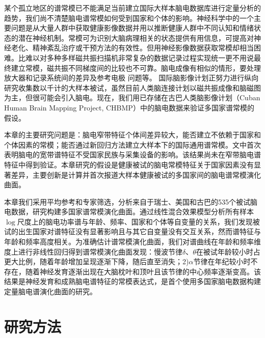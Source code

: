某个孤立地区的谱常模已不能满足当前建立国际大样本脑电数据库进行定量分析的趋势，我们尚不清楚脑电谱常模如何受到国家和个体的影响。神经科学中的一个主要问题是从大量人群中获取健康影像数据并用以推断健康人群中不同认知和情绪状态的潜在神经机制。常模可为识别大脑病理相关的状态提供有用信息，可提高对神经老化、精神紊乱治疗或干预方法的有效性。但用神经影像数据获取常模却相当困难。比难以对多种多样磁共振扫描机非常复杂的数据记录过程实现统一更不用说最终建立常模，磁共振不同梯度间的比较也不可靠。脑电成像有相似的情形，要处理放大器和记录系统间的差异及参考电极
问题等。 国际脑影像计划正努力进行纵向研究收集数以千计的大样本被试，虽然目前人类脑连接计划以磁共振成像和脑磁图为主，但很可能会引入脑电。现在，我们用已存储在古巴人类脑影像计划（Cuban Human Brain Mapping Project, CHBMP）中的脑电数据来验证多国家谱常模的假设。

本章的主要研究问题是：脑电窄带特征个体间差异较大，能否建立不依赖于国家和个体因素的常模；能否通过新回归方法建立大样本下的国际通用谱常模。\cite{john1977neurometrics}文中首次表明脑电的宽带谱特征不受国家民族与采集设备的影响。该结果尚未在窄带脑电谱特征中得到验证。本章研究的假设是健康被试的脑电常模特征关于国家因素没有显著差异，主要创新是计算并首次报道大样本健康被试的多国家间的脑电谱常模演化曲面。

本章我们采用平均参考和专家筛选，分析来自于瑞士、美国和古巴的535个被试脑电数据，研究构建多国家谱常模演化曲面。通过线性混合效果模型分析所有样本$\log$尺度上的脑电功率谱与年龄、频率、国家和个体等自变量的关系，我们发现被试的出生国家对谱特征没有显著影响且与其它自变量没有交互关系，然而谱特征与年龄和频率高度相关。为准确估计谱常模演化曲面，我们对谱曲线在年龄和频率维度上进行非线性回归得到谱常模演化曲面发现：慢波节律$\delta$、$\theta$在被试年龄较小时占更大比例，随着年龄增加呈现逐渐下降，随后直至消失；2)$\alpha$节律在年纪较小时不存在，随着神经发育逐渐出现在大脑枕叶和顶叶且该节律的中心频率逐渐变高。该结果是神经发育和成熟脑电谱特征的常模表达式，是首个使用多国家脑电数据构建定量脑电谱演化曲面的研究。
\section{研究方法}
